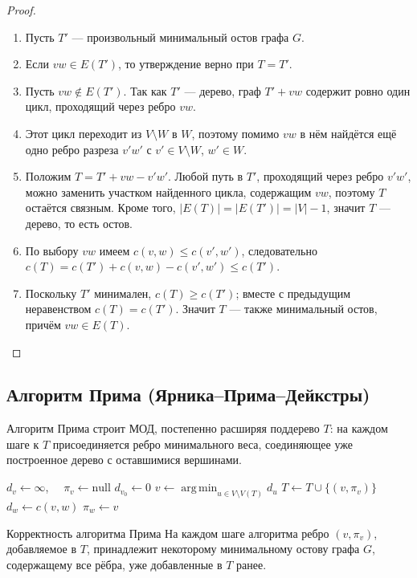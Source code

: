 \begin{proof}
	\begin{enumerate}
		\item Пусть $T'$ --- произвольный минимальный остов графа $G$.
		\item Если $vw \in E(T')$, то утверждение верно при $T = T'$.
		\item Пусть $vw \notin E(T')$. Так как $T'$ --- дерево, граф $T' + vw$ содержит ровно один цикл, проходящий через ребро $vw$.
		\item Этот цикл переходит из $V \setminus W$ в $W$, поэтому помимо $vw$ в нём найдётся ещё одно ребро разреза $v'w'$ с $v' \in V \setminus W$, $w' \in W$.
		\item Положим $T = T' + vw - v'w'$. Любой путь в $T'$, проходящий через ребро $v'w'$, можно заменить участком найденного цикла, содержащим $vw$, поэтому $T$ остаётся связным. Кроме того, $|E(T)| = |E(T')| = |V|-1$, значит $T$ --- дерево, то есть остов.
		\item По выбору $vw$ имеем $c(v,w) \leq c(v',w')$, следовательно $c(T) = c(T') + c(v,w) - c(v',w') \leq c(T')$.
		\item Поскольку $T'$ минимален, $c(T) \geq c(T')$; вместе с предыдущим неравенством $c(T) = c(T')$. Значит $T$ --- также минимальный остов, причём $vw \in E(T)$.
	\end{enumerate}
\end{proof}

\subsection{Алгоритм Прима (Ярника--Прима--Дейкстры)}

Алгоритм Прима строит МОД, постепенно расширяя поддерево $T$: на каждом шаге к $T$ присоединяется ребро минимального веса, соединяющее уже построенное дерево с оставшимися вершинами.

\begin{algorithmic}
	\State $d_v \gets \infty$, $\quad \pi_v \gets \mathrm{null}$
	\EndFor
	\State $d_{v_0} \gets 0$ 
	\State $v \gets \displaystyle\operatorname*{arg\,min}_{u \in V\setminus V(T)} d_u$
	\State $T \gets T \cup \{(v,\pi_v)\}$
	\State $d_w \gets c(v,w)$
	\State $\pi_w \gets v$
	\EndIf
	\EndFor
	\EndFor
\end{algorithmic}

\begin{Theorem}{Корректность алгоритма Прима}{}
	На каждом шаге алгоритма ребро $(v, \pi_v)$, добавляемое в $T$, принадлежит некоторому минимальному остову графа $G$, содержащему все рёбра, уже добавленные в $T$ ранее.
\end{Theorem}


